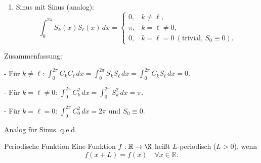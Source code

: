 \begin{beweisbox}
\begin{enumerate}
        \item Sinus mit Sinus (analog):
        $$
        \int_{0}^{2\pi} S_k(x)S_\ell(x)\,dx =
        \begin{cases}
            0, & k\neq\ell,\\[4pt]
            \pi, & k=\ell\neq0,\\[4pt]
            0, & k=\ell=0\ (\text{trivial, }S_0\equiv 0).
        \end{cases}
        $$
    \end{enumerate}

    Zusammenfassung:

    - Für $k\neq\ell$: $\displaystyle\int_{0}^{2\pi} C_k C_\ell\,dx = \int_{0}^{2\pi} S_k S_\ell\,dx = \int_{0}^{2\pi} C_k S_\ell\,dx = 0.$

    - Für $k=\ell\neq0$: $\displaystyle\int_{0}^{2\pi} C_k^2\,dx = \int_{0}^{2\pi} S_k^2\,dx = \pi.$

    - Für $k=\ell=0$: $\displaystyle\int_{0}^{2\pi} C_0^2\,dx = 2\pi$ und $S_0\equiv0$.

    Analog für Sinus. q.e.d.

\end{beweisbox}


\begin{definition}{Periodische Funktion}
    Eine Funktion $f:\mathbb{R}\to \K$ heißt $L$-periodisch ($L>0$), wenn
    $$
        f(x+L)=f(x)\quad\forall x\in\mathbb{R}.
    $$
\end{definition}

